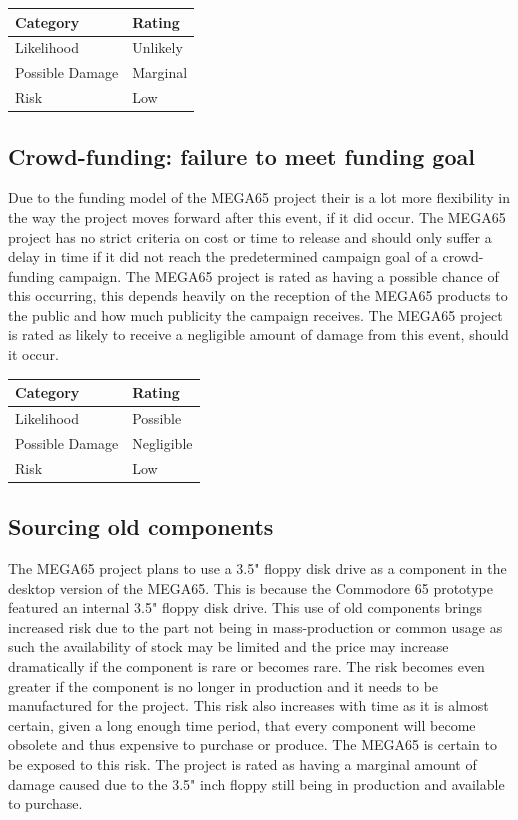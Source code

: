 \begin{tabular}{l|l} %
    	\textbf{Category} 	&	\textbf{Rating} \\
      \hline
     Likelihood			&	Unlikely \\
     Possible Damage 	& 	Marginal \\
     Risk 				&	Low		\\	
    \end{tabular}


\subsection{Crowd-funding: failure to meet funding goal}
Due to the funding model of the MEGA65 project their is a lot more flexibility in the way the project moves forward after this event, if it did occur. The MEGA65 project has no strict criteria on cost or time to release and should only suffer a delay in time if it did not reach the predetermined campaign goal of a crowd-funding campaign. The MEGA65 project is rated as having a possible chance of this occurring, this depends heavily on the reception of the MEGA65 products to the public and how much publicity the campaign receives. The MEGA65 project is rated as likely to receive a negligible amount of damage from this event, should it occur. \\

\begin{tabular}{l|l} %
    	\textbf{Category} 	&	\textbf{Rating} \\
      \hline
     Likelihood			&	Possible \\
     Possible Damage 	& 	Negligible \\
     Risk 				&	Low		\\	
    \end{tabular}


\subsection{Sourcing old components}
The MEGA65 project plans to use a 3.5" floppy disk drive as a component in the desktop version of the MEGA65. This is because the Commodore 65 prototype featured an internal 3.5" floppy disk drive. This use of old components brings increased risk due to the part not being in mass-production or common usage as such the availability of stock may be limited and the price may increase dramatically if the component is rare or becomes rare. The risk becomes even greater if the component is no longer in production and it needs to be manufactured for the project. This risk also increases with time as it is almost certain, given a long enough time period, that every component will become obsolete and thus expensive to purchase or produce. The MEGA65 is certain to be exposed to this risk. The project is rated as having a marginal amount of damage caused due to the 3.5" inch floppy still being in production and available to purchase. \\


